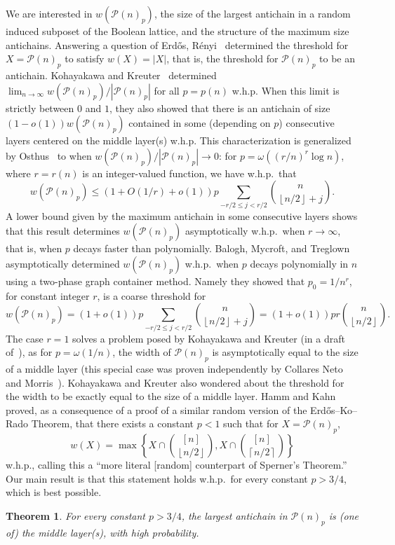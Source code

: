 \documentclass[12pt]{article}
\renewcommand{\P}{\mathcal{P}}
\newcommand{\floor}[1]{\left\lfloor#1\right\rfloor}
\newcommand{\ceil}[1]{\left\lceil#1\right\rceil}
\newtheorem{theorem}{Theorem}
\begin{document}
We are interested in $w(\P(n)_p)$, the size of the largest antichain in a random induced subposet of the Boolean lattice, and the structure of the maximum size antichains. Answering a question of Erd\H{o}s, R\'enyi~\cite{Renyi} determined the threshold for $X = \P(n)_p$ to satisfy $w(X) = |X|$, that is, the threshold for $\P(n)_p$ to be an antichain. Kohayakawa and Kreuter~\cite{KK} determined $\lim_{n\to\infty} w(\P(n)_p)/|\P(n)_p|$ for all $p=p(n)$ w.h.p. When this limit is strictly between $0$ and $1$, they also showed that there is an antichain of size $(1-o(1))w(\P(n)_p)$ contained in some (depending on $p$) consecutive layers centered on the middle layer(s) w.h.p. This characterization is generalized by Osthus~\cite{Osthus} to when $w(\P(n)_p)/|\P(n)_p| \to 0$: for $p = \omega((r/n)^r \log n)$, where $r=r(n)$ is an integer-valued function, we have w.h.p.\ that
\[ w(\P(n)_p) \leq (1 + O(1/r) + o(1)) p \sum_{-r/2\leq j<r/2} \binom{n}{\floor{n/2}+j} .\]
A lower bound given by the maximum antichain in some consecutive layers shows that this result determines $w(\P(n)_p)$ asymptotically w.h.p.\ when $r \to \infty$, that is, when $p$ decays faster than polynomially. Balogh, Mycroft, and Treglown~\cite{BMT} asymptotically determined $w(\P(n)_p)$ w.h.p.\ when $p$ decays polynomially in $n$ using a two-phase graph container method. Namely they showed that $p_0 = 1/n^r$, for constant integer $r$, is a coarse threshold for
\[ w(\P(n)_p) = (1+o(1)) p \sum_{-r/2 \leq j < r/2} \binom{n}{\floor{n/2}+j} = (1+o(1)) p r \binom{n}{\floor{n/2}} .\]
The case $r=1$ solves a problem posed by Kohayakawa and Kreuter (in a draft of~\cite{KK}), as for $p = \omega(1/n)$, the width of $\P(n)_p$ is asymptotically equal to the size of a middle layer (this special case was proven independently by Collares Neto and Morris~\cite{CNM}). Kohayakawa and Kreuter also wondered about the threshold for the width to be exactly equal to the size of a middle layer. Hamm and Kahn~\cite{HK2} proved, as a consequence of a proof of a similar random version of the Erd\H{o}s--Ko--Rado Theorem, that there exists a constant $p<1$ such that for $X = \P(n)_p$,
\[ w(X) = \max\left\{ X \cap \binom{[n]}{\floor{n/2}}, X \cap \binom{[n]}{\ceil{n/2}} \right\} \]
w.h.p., calling this a ``more literal [random] counterpart of Sperner's Theorem.'' Our main result is that this statement holds w.h.p.\ for every constant $p>3/4$, which is best possible.
\begin{theorem}\label{thm::main}
For every constant $p>3/4$, the largest antichain in $\P(n)_p$ is (one of) the middle layer(s), with high probability.
\end{theorem}
\end{document}
